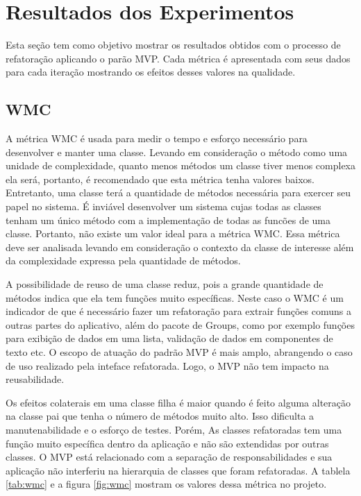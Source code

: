 \section{Resultados dos Experimentos}

Esta seção tem como objetivo mostrar os resultados obtidos com o processo de
refatoração aplicando o parão MVP. Cada métrica é apresentada com seus dados
para cada iteração mostrando os efeitos desses valores na qualidade.

\subsection{WMC}

A métrica WMC é usada para medir o tempo e esforço necessário para desenvolver e
manter uma classe. Levando em consideração o método como uma unidade de
complexidade, quanto menos métodos um classe tiver menos complexa ela será,
portanto, é recomendado que esta métrica tenha valores baixos.
Entretanto, uma classe terá a quantidade de métodos necessária para exercer seu
papel no sistema. É inviável desenvolver um sistema cujas todas as classes
tenham um único método com a implementação de todas as funcões de uma
classe. Portanto, não existe um valor ideal para a métrica WMC. Essa métrica
deve ser analisada levando em consideração o contexto da classe de interesse além da
complexidade expressa pela quantidade de métodos. 

A possibilidade de reuso de uma classe reduz, pois a grande quantidade de
métodos indica que ela tem funções muito específicas\cite{cksuite}. Neste caso o
WMC é um indicador de que é necessário fazer um refatoração para extrair funções comuns a outras partes do
aplicativo, além do pacote de Groups, como por exemplo funções para exibição de
dados em uma lista, validação de dados em componentes de texto etc. O escopo de
atuação do padrão MVP é mais amplo, abrangendo o caso de uso realizado pela
inteface refatorada. Logo, o MVP não tem impacto na reusabilidade.

Os efeitos colaterais em uma classe filha é maior quando é feito alguma
alteração na classe pai que tenha o número de métodos muito alto\cite{cksuite}.
Isso dificulta a manutenabilidade e o esforço de testes. Porém, As classes
refatoradas tem uma função muito específica dentro da aplicação e não são
extendidas por outras classes. O MVP está relacionado com a separação de
responsabilidades e sua aplicação não interferiu na hierarquia de classes que
foram refatoradas.
A tablela \ref{tab:wmc} e a figura \ref{fig:wmc} mostram os valores dessa
métrica no projeto.


